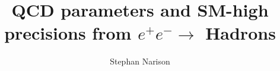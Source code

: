 \documentclass[review]{elsarticle}
\begin{document}
\begin{frontmatter}

\title{QCD parameters and SM-high precisions from $e^+e^-\to$  Hadrons}
\author{Stephan Narison%
}
\address{Laboratoire
Univers et Particules de Montpellier (LUPM), CNRS-IN2P3, \\
Case 070, Place Eug\`ene
Bataillon, 34095 - Montpellier, France\\
and\\
Institute of High-Energy Physics of Madagascar (iHEPMAD)\\
University of Ankatso, Antananarivo 101, Madagascar}






\end{frontmatter}
\end{document}
